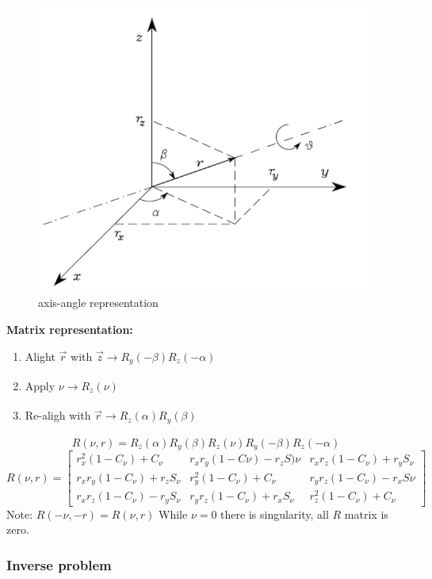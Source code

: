 \documentclass{article}
\begin{document}
\begin{figure}[h!]
\includegraphics[scale=1.5]{axisAngle.png}
\caption{axis-angle representation}
\label{fig:sr}
\end{figure}

\textbf{Matrix representation:}
\begin{enumerate}
    \item Alight $\vec{r} $ with $ \vec{z}  \xrightarrow[]{}  R_{y}(-\beta)R_{z}(-\alpha) $
    \item Apply $ \nu  \xrightarrow[]{}  R_{z}(\nu)$
    \item Re-aligh with $\vec{r} \xrightarrow[]{}  R_{z}(\alpha)R_{y}(\beta) $
\end{enumerate}
$$ R(\nu, r)  = R_{z}(\alpha)R_{y}(\beta)R_{z}(\nu)R_{y}(-\beta)R_{z}(-\alpha) $$
$$
R(\nu, r) =
\begin{bmatrix}
r^{2}_{x}(1-C_{\nu})+C_{\nu} & r_{x}r_{y}(1-C{\nu} ) - r_{z}S){\nu} & r_{x}r_{z}(1-C_{\nu} )+r_{y}S_{\nu} \\
r_{x}r_{y}(1-C_{\nu})+r_{z}S_{\nu} & r^{2}_{y}(1-C_{\nu})+C_{\nu} & r_{y}r_{z}(1-C_{\nu})-r_{x}S{\nu} \\
r_{x}r_{z}(1-C_{\nu})-r_{y}S_{\nu} & r_{y}r_{z}(1-C_{\nu})+r_{x}S_{\nu} & r^{2}_{z}(1-C_{\nu})+C_{\nu}
\end{bmatrix}
$$
Note: $ R(-\nu, -r) = R(\nu, r)$
While $\nu=0$ there is singularity, all $R$ matrix is zero.


\subsubsection{Inverse problem}
\end{document}
